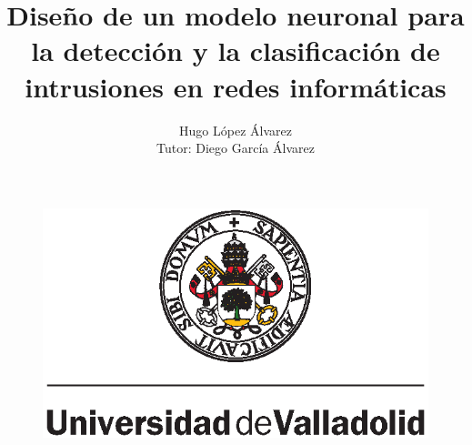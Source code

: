\title{Diseño de un modelo neuronal para la detección y la clasificación de intrusiones en redes informáticas}
\author{Hugo López Álvarez \\ Tutor: Diego García Álvarez
}
\begin{frame}
    \titlepage
    \begin{figure}[H]
        \begin{center}
            \includegraphics[width=0.25\linewidth]{img/uva.eps}
        \end{center}
    \end{figure}
\end{frame}
